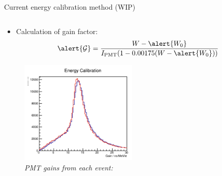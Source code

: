 \documentclass{ikpKoeln}
\begin{document}
\begin{frame}[t]{Current energy calibration method (WIP)}
\begin{columns}[t]
\begin{column}{0.45 \textwidth}
{\begin{itemize}
					      \vspace{-0.5em}
                          $$ \alert{\alpha} = \ln((W_r - W_0)/(W_l - W_0)) / (2 \cdot x)$$
					\item \vspace{-1em}Calculation of gain factor:
					      \vspace{-0.5em}
					      $$\alert{\mathcal{G}} = \frac{W - \alert{W_0}}{I_\text{PMT} (1 - 0.00175(W - \alert{W_0}))}$$
				\end{itemize}
			}
			\begin{figure}
				\captionsetup{singlelinecheck=off,font=footnotesize}
				\vspace{-2em}
				\caption*{\textit{PMT gains from each event:}}
				\vspace{-1em}
				\includegraphics[width = 0.5\textwidth]{neuland/PMTGains.png}
			\end{figure}
		\end{column}
	\end{columns}
\end{frame}
\end{document}
